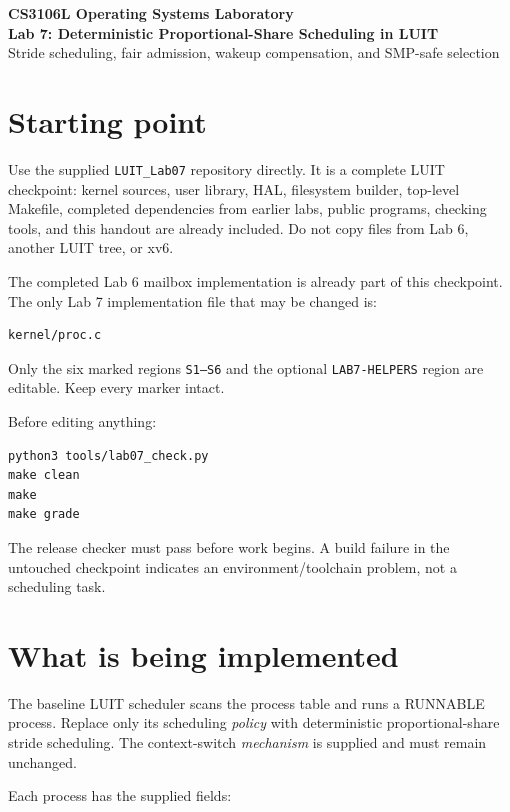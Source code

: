 \documentclass[11pt,a4paper]{article}
\newcommand{\file}[1]{\texttt{#1}}
\begin{document}
\begin{center}
{\LARGE\bfseries CS3106L Operating Systems Laboratory}\\[3pt]
{\Large\bfseries Lab 7: Deterministic Proportional-Share Scheduling in LUIT}\\[3pt]
{\large Stride scheduling, fair admission, wakeup compensation, and SMP-safe selection}
\end{center}

\section{Starting point}

Use the supplied \file{LUIT\_Lab07} repository directly. It is a complete LUIT checkpoint: kernel sources, user library, HAL, filesystem builder, top-level Makefile, completed dependencies from earlier labs, public programs, checking tools, and this handout are already included. Do not copy files from Lab 6, another LUIT tree, or xv6.

The completed Lab 6 mailbox implementation is already part of this checkpoint. The only Lab 7 implementation file that may be changed is:

\begin{lstlisting}
kernel/proc.c
\end{lstlisting}

Only the six marked regions \file{S1--S6} and the optional \file{LAB7-HELPERS} region are editable. Keep every marker intact.

Before editing anything:

\begin{lstlisting}
python3 tools/lab07_check.py
make clean
make
make grade
\end{lstlisting}

The release checker must pass before work begins. A build failure in the untouched checkpoint indicates an environment/toolchain problem, not a scheduling task.

\section{What is being implemented}

The baseline LUIT scheduler scans the process table and runs a RUNNABLE process. Replace only its scheduling \emph{policy} with deterministic proportional-share stride scheduling. The context-switch \emph{mechanism} is supplied and must remain unchanged.

Each process has the supplied fields:
\end{document}

